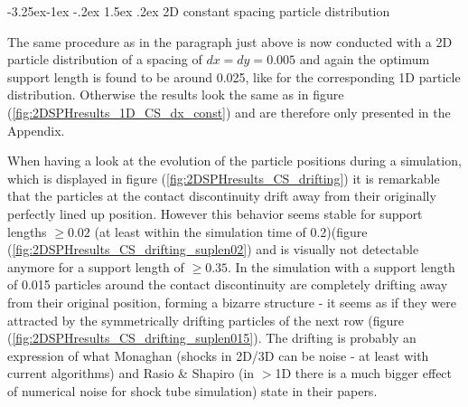 \documentclass{report}
\makeatletter
\renewcommand\paragraph{\@startsection{paragraph}{4}{\z@}%
  {-3.25ex\@plus -1ex \@minus -.2ex}%
  {1.5ex \@plus .2ex}%
  {\normalfont\normalsize\bfseries}}
\makeatother
\begin{document}
\paragraph{2D constant spacing particle distribution}

The same procedure as in the paragraph just above is now conducted with a 2D particle distribution of a spacing of $dx=dy=0.005$ and again the optimum support length is found to be around 0.025, like for the corresponding 1D particle distribution. Otherwise the results look the same as in figure (\ref{fig:2DSPHresults_1D_CS_dx_const}) and are therefore only presented in the Appendix.

When having a look at the evolution of the particle positions during a simulation, which is displayed in figure (\ref{fig:2DSPHresults_CS_drifting}) it is remarkable that the particles at the contact discontinuity drift away from their originally perfectly lined up position. However this behavior seems stable for support lengths $\geq0.02$ (at least within the simulation time of 0.2)(figure (\ref{fig:2DSPHresults_CS_drifting_suplen02}) and is visually not detectable anymore for a support length of $\geq0.35$. In the simulation with a support length of 0.015 particles around the contact discontinuity are completely drifting  away from their original position, forming a bizarre structure - it seems as if they were attracted by the symmetrically drifting particles of the next row (figure (\ref{fig:2DSPHresults_CS_drifting_suplen015}). 
The drifting is probably an expression of what Monaghan \cite{Monaghan2005} (shocks in 2D/3D can be noise - at least with current algorithms) and Rasio \& Shapiro \cite{Rasio1991} (in $>$1D there is a much bigger effect of numerical noise for shock tube simulation) state in their papers.
\end{document}
